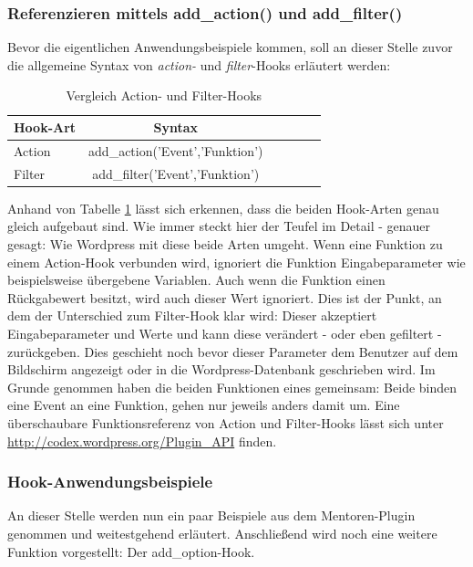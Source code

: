 \subsubsection{Referenzieren mittels add\_action() und add\_filter()}\label{refmitaddacunaddfilt}
Bevor die eigentlichen Anwendungsbeispiele kommen, soll an dieser Stelle zuvor die allgemeine Syntax von \emph{action-} und \emph{filter}-Hooks erläutert werden:
\begin{table}[ht]
\centering
\begin{tabular}[h]{|l|c|c|c|c|c|}
\hline
\textbf{Hook-Art} & \textbf{Syntax} \\
\hline
Action & add\_action('Event','Funktion') \\
Filter & add\_filter('Event','Funktion') \\
\hline
\end{tabular}
\caption{Vergleich Action- und Filter-Hooks}
\label{tab:vglactufilhooks}
\end{table}
Anhand von Tabelle \ref{tab:vglactufilhooks} lässt sich erkennen, dass die beiden Hook-Arten genau gleich aufgebaut sind. Wie immer steckt hier der Teufel im Detail - genauer gesagt: Wie Wordpress mit diese beide Arten umgeht.\newline
Wenn eine Funktion zu einem Action-Hook verbunden wird, ignoriert die Funktion Eingabeparameter wie beispielsweise übergebene Variablen. Auch wenn die Funktion einen Rückgabewert besitzt, wird auch dieser Wert ignoriert. \newline
Dies ist der Punkt, an dem der Unterschied zum Filter-Hook klar wird: Dieser akzeptiert Eingabeparameter und Werte und kann diese verändert - oder eben gefiltert - zurückgeben.\newline
 Dies geschieht noch bevor dieser Parameter dem Benutzer auf dem Bildschirm angezeigt oder in die Wordpress-Datenbank geschrieben wird.\newline
 Im Grunde genommen haben die beiden Funktionen eines gemeinsam: Beide binden eine Event an eine Funktion, gehen nur jeweils anders damit um.\newline
  Eine überschaubare Funktionsreferenz von Action und Filter-Hooks lässt sich unter \url{http://codex.wordpress.org/Plugin_API} finden.
  
 \subsubsection{Hook-Anwendungsbeispiele}
 An dieser Stelle werden nun ein paar Beispiele aus dem Mentoren-Plugin genommen und weitestgehend erläutert. Anschließend wird noch eine weitere Funktion vorgestellt: Der add\_option-Hook.
